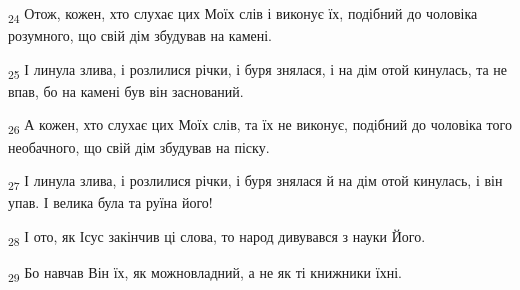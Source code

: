 \begin{tcolorbox}
\textsubscript{24} Отож, кожен, хто слухає цих Моїх слів і виконує їх, подібний до чоловіка розумного, що свій дім збудував на камені.
\end{tcolorbox}
\begin{tcolorbox}
\textsubscript{25} І линула злива, і розлилися річки, і буря знялася, і на дім отой кинулась, та не впав, бо на камені був він заснований.
\end{tcolorbox}
\begin{tcolorbox}
\textsubscript{26} А кожен, хто слухає цих Моїх слів, та їх не виконує, подібний до чоловіка того необачного, що свій дім збудував на піску.
\end{tcolorbox}
\begin{tcolorbox}
\textsubscript{27} І линула злива, і розлилися річки, і буря знялася й на дім отой кинулась, і він упав. І велика була та руїна його!
\end{tcolorbox}
\begin{tcolorbox}
\textsubscript{28} І ото, як Ісус закінчив ці слова, то народ дивувався з науки Його.
\end{tcolorbox}
\begin{tcolorbox}
\textsubscript{29} Бо навчав Він їх, як можновладний, а не як ті книжники їхні.
\end{tcolorbox}
